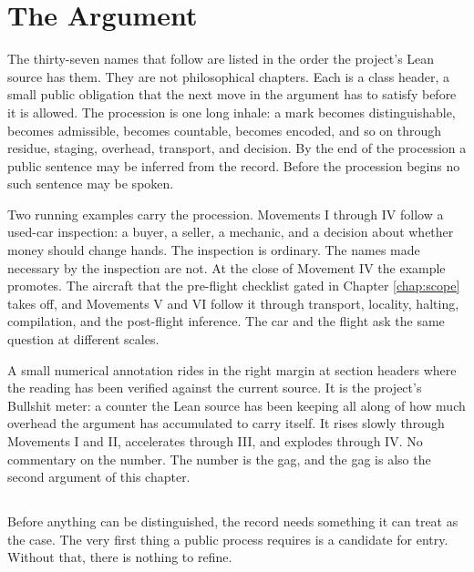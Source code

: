 \chapter{The Argument}
\label{chap:argument}


The thirty-seven names that follow are listed in the order the project's Lean
source has them. They are not philosophical chapters. Each is a class header,
a small public obligation that the next move in the argument has to satisfy
before it is allowed. The procession is one long inhale: a mark becomes
distinguishable, becomes admissible, becomes countable, becomes encoded, and
so on through residue, staging, overhead, transport, and decision. By the end
of the procession a public sentence may be inferred from the record. Before
the procession begins no such sentence may be spoken.

Two running examples carry the procession. Movements I through IV follow a
used-car inspection: a buyer, a seller, a mechanic, and a decision about
whether money should change hands. The inspection is ordinary. The names made
necessary by the inspection are not. At the close of Movement IV the example
promotes. The aircraft that the pre-flight checklist gated in Chapter
\ref{chap:scope} takes off, and Movements V and VI follow it through
transport, locality, halting, compilation, and the post-flight inference. The
car and the flight ask the same question at different scales.

A small numerical annotation rides in the right margin at section headers
where the reading has been verified against the current source. It is the
project's Bullshit meter: a counter the Lean source has been keeping all
along of how much overhead the argument has accumulated to carry itself. It
rises slowly through Movements I and II, accelerates through III, and
explodes through IV. No commentary on the number. The number is the gag, and
the gag is also the second argument of this chapter.

\section{}
\label{se:fact}

Before anything can be distinguished, the record needs something it can treat
as the case. The very first thing a public process requires is a candidate
for entry. Without that, there is nothing to refine.

